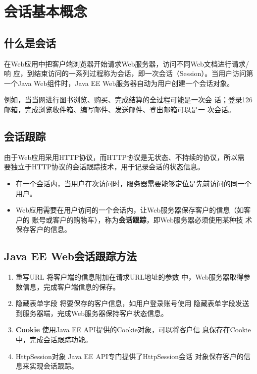 \section{会话基本概念}

\subsection{什么是会话} 

在Web应用中把客户端浏览器开始请求Web服务器，访问不同Web文档进行请求/响
应，到结束访问的一系列过程称为会话，即一次会话（Session）。当用户访问第
一个Java Web组件时，Java EE Web服务器自动为用户创建一个会话对象。

{\Blue\kai 例如，当当网进行图书浏览、购买、完成结算的全过程可能是一次会
  话；登录126邮箱，完成浏览收件箱、编写邮件、发送邮件、登出邮箱可以是一
  次会话。}

\subsection{会话跟踪} 


{\kai 由于Web应用采用HTTP协议，而HTTP协议是无状态、不持续的协议，所以需
  要独立于HTTP协议的会话跟踪技术，用于记录会话的状态信息。}


\begin{itemize}
\item 在一个会话内，当用户在次访问时，服务器需要能够定位是先前访问的同一个用户。
\item Web应用需要在用户访问的一个会话内，让Web服务器保存客户的信息（如客户的
  账号或客户的购物车），称为{\bf\Red 会话跟踪}，即Web服务器必须使用某种技
  术保存客户的信息。
\end{itemize}


\subsection{Java EE Web会话跟踪方法} 

\begin{enumerate}
\item {\hei\Red 重写URL} 将客户端的信息附加在请求URL地址的参数
  中，Web服务器取得参数信息，完成客户端信息的保存。
\item {\hei\Red 隐藏表单字段} 将要保存的客户信息，如用户登录账号使用
  隐藏表单字段发送到服务器端，完成Web服务器保持客户状态信息。
\item {\bf\Red Cookie} 使用Java EE API提供的Cookie对象，可以将客户信
  息保存在Cookie中，完成会话跟踪功能。
\item {\hei\Red HttpSession对象} Java EE API专门提供了HttpSession会话
  对象保存客户的信息来实现会话跟踪。
\end{enumerate}

